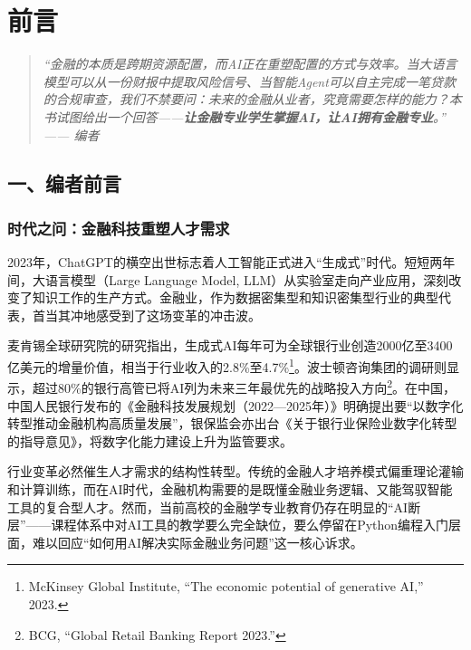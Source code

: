
\chapter*{前言}

\vspace{1em}

\begin{quote}
\itshape
``金融的本质是跨期资源配置，而AI正在重塑配置的方式与效率。当大语言模型可以从一份财报中提取风险信号、当智能Agent可以自主完成一笔贷款的合规审查，我们不禁要问：未来的金融从业者，究竟需要怎样的能力？本书试图给出一个回答——\textbf{让金融专业学生掌握AI，让AI拥有金融专业}。''\\
\upshape\hfill —— 编者
\end{quote}

\vspace{2em}


\section*{一、编者前言}

\subsection*{时代之问：金融科技重塑人才需求}

2023年，ChatGPT的横空出世标志着人工智能正式进入``生成式''时代。短短两年间，大语言模型（Large Language Model, LLM）从实验室走向产业应用，深刻改变了知识工作的生产方式。金融业，作为数据密集型和知识密集型行业的典型代表，首当其冲地感受到了这场变革的冲击波。

麦肯锡全球研究院的研究指出，生成式AI每年可为全球银行业创造2000亿至3400亿美元的增量价值，相当于行业收入的2.8\%至4.7\%\footnote{McKinsey Global Institute, ``The economic potential of generative AI,'' 2023.}。波士顿咨询集团的调研则显示，超过80\%的银行高管已将AI列为未来三年最优先的战略投入方向\footnote{BCG, ``Global Retail Banking Report 2023.''}。在中国，中国人民银行发布的《金融科技发展规划（2022—2025年）》明确提出要``以数字化转型推动金融机构高质量发展''，银保监会亦出台《关于银行业保险业数字化转型的指导意见》，将数字化能力建设上升为监管要求。

行业变革必然催生人才需求的结构性转型。传统的金融人才培养模式偏重理论灌输和计算训练，而在AI时代，金融机构需要的是既懂金融业务逻辑、又能驾驭智能工具的复合型人才。然而，当前高校的金融学专业教育仍存在明显的``AI断层''——课程体系中对AI工具的教学要么完全缺位，要么停留在Python编程入门层面，难以回应``如何用AI解决实际金融业务问题''这一核心诉求。


